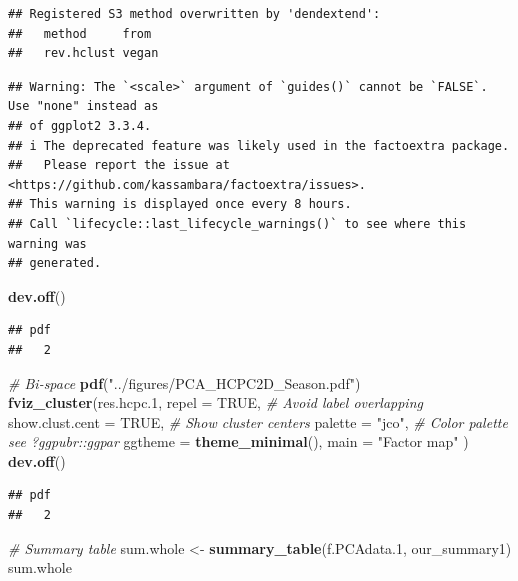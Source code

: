 \documentclass[
]{article}
\newenvironment{Shaded}{\begin{snugshade}}{\end{snugshade}}
\newcommand{\AttributeTok}[1]{\textcolor[rgb]{0.13,0.29,0.53}{#1}}
\newcommand{\CommentTok}[1]{\textcolor[rgb]{0.56,0.35,0.01}{\textit{#1}}}
\newcommand{\ConstantTok}[1]{\textcolor[rgb]{0.56,0.35,0.01}{#1}}
\newcommand{\FloatTok}[1]{\textcolor[rgb]{0.00,0.00,0.81}{#1}}
\newcommand{\FunctionTok}[1]{\textcolor[rgb]{0.13,0.29,0.53}{\textbf{#1}}}
\newcommand{\NormalTok}[1]{#1}
\newcommand{\OtherTok}[1]{\textcolor[rgb]{0.56,0.35,0.01}{#1}}
\newcommand{\StringTok}[1]{\textcolor[rgb]{0.31,0.60,0.02}{#1}}
\begin{document}
\begin{verbatim}
## Registered S3 method overwritten by 'dendextend':
##   method     from 
##   rev.hclust vegan
\end{verbatim}

\begin{verbatim}
## Warning: The `<scale>` argument of `guides()` cannot be `FALSE`. Use "none" instead as
## of ggplot2 3.3.4.
## i The deprecated feature was likely used in the factoextra package.
##   Please report the issue at <https://github.com/kassambara/factoextra/issues>.
## This warning is displayed once every 8 hours.
## Call `lifecycle::last_lifecycle_warnings()` to see where this warning was
## generated.
\end{verbatim}

\begin{Shaded}
\begin{Highlighting}[]
\FunctionTok{dev.off}\NormalTok{()}
\end{Highlighting}
\end{Shaded}

\begin{verbatim}
## pdf 
##   2
\end{verbatim}

\begin{Shaded}
\begin{Highlighting}[]
\CommentTok{\# Bi{-}space}
\FunctionTok{pdf}\NormalTok{(}\StringTok{"../figures/PCA\_HCPC2D\_Season.pdf"}\NormalTok{)}
\FunctionTok{fviz\_cluster}\NormalTok{(res.hcpc}\FloatTok{.1}\NormalTok{,}
             \AttributeTok{repel =} \ConstantTok{TRUE}\NormalTok{,            }\CommentTok{\# Avoid label overlapping}
             \AttributeTok{show.clust.cent =} \ConstantTok{TRUE}\NormalTok{, }\CommentTok{\# Show cluster centers}
             \AttributeTok{palette =} \StringTok{"jco"}\NormalTok{,         }\CommentTok{\# Color palette see ?ggpubr::ggpar}
             \AttributeTok{ggtheme =} \FunctionTok{theme\_minimal}\NormalTok{(),}
             \AttributeTok{main =} \StringTok{"Factor map"}
\NormalTok{             )}
\FunctionTok{dev.off}\NormalTok{()}
\end{Highlighting}
\end{Shaded}

\begin{verbatim}
## pdf 
##   2
\end{verbatim}

\begin{Shaded}
\begin{Highlighting}[]
\CommentTok{\# Summary table}
\NormalTok{sum.whole }\OtherTok{\textless{}{-}} \FunctionTok{summary\_table}\NormalTok{(f.PCAdata}\FloatTok{.1}\NormalTok{, our\_summary1)}
\NormalTok{sum.whole}
\end{Highlighting}
\end{Shaded}
\end{document}
